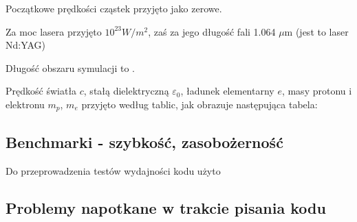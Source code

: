     Początkowe prędkości cząstek przyjęto jako zerowe. 

    Za moc lasera przyjęto $10^{23} W/m^2$, 
    zaś za jego długość fali 1.064 $\mu$m (jest to laser Nd:YAG)

    Długość obszaru symulacji to .

    Prędkość światła $c$, stałą dielektryczną $\varepsilon_0$, ładunek elementarny $e$, masy protonu i elektronu $m_p$, $m_e$ przyjęto według tablic,
    jak obrazuje następująca tabela:


    \subsection{Benchmarki - szybkość, zasobożerność} 
    Do przeprowadzenia testów wydajności kodu użyto 
    \subsection{Problemy napotkane w trakcie pisania kodu}
